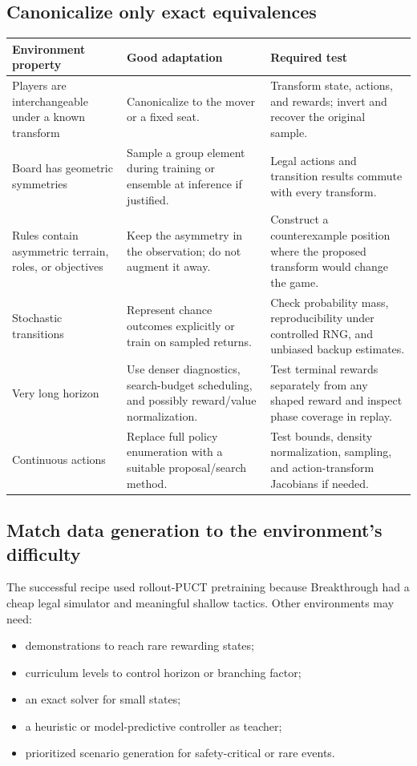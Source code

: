 \documentclass[10.5pt,letterpaper]{article}
\begin{document}
\subsection{Canonicalize only exact equivalences}

\begin{center}
\small
\begin{tabularx}{\textwidth}{L{0.21\textwidth} Y Y}
\toprule
\sffamily\bfseries Environment property &
\sffamily\bfseries Good adaptation &
\sffamily\bfseries Required test \\
\midrule
Players are interchangeable under a known transform &
Canonicalize to the mover or a fixed seat. &
Transform state, actions, and rewards; invert and recover the original sample. \\
Board has geometric symmetries &
Sample a group element during training or ensemble at inference if justified. &
Legal actions and transition results commute with every transform. \\
Rules contain asymmetric terrain, roles, or objectives &
Keep the asymmetry in the observation; do not augment it away. &
Construct a counterexample position where the proposed transform would change
the game. \\
Stochastic transitions &
Represent chance outcomes explicitly or train on sampled returns. &
Check probability mass, reproducibility under controlled RNG, and unbiased
backup estimates. \\
Very long horizon &
Use denser diagnostics, search-budget scheduling, and possibly reward/value
normalization. &
Test terminal rewards separately from any shaped reward and inspect phase
coverage in replay. \\
Continuous actions &
Replace full policy enumeration with a suitable proposal/search method. &
Test bounds, density normalization, sampling, and action-transform Jacobians if
needed. \\
\bottomrule
\end{tabularx}
\end{center}

\subsection{Match data generation to the environment's difficulty}

The successful recipe used rollout-PUCT pretraining because Breakthrough had a
cheap legal simulator and meaningful shallow tactics. Other environments may
need:
\begin{itemize}
  \item demonstrations to reach rare rewarding states;
  \item curriculum levels to control horizon or branching factor;
  \item an exact solver for small states;
  \item a heuristic or model-predictive controller as teacher;
  \item prioritized scenario generation for safety-critical or rare events.
\end{itemize}
\end{document}
